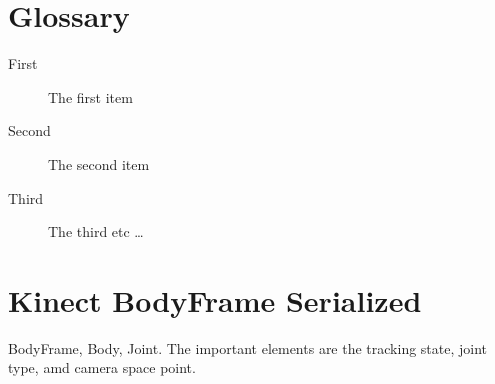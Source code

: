 \documentclass{sigchi}
\begin{document}
\begin{appendices}

\chapter{Glossary}

\begin{description}
  \item[First] The first item
  \item[Second] The second item
  \item[Third] The third etc \ldots
\end{description}

\chapter{Kinect BodyFrame Serialized}

BodyFrame, Body, Joint. The important elements are the tracking state, joint type, amd camera space point.

\cite{microsoft_kinect_namespace}

\end{appendices}
\end{document}
